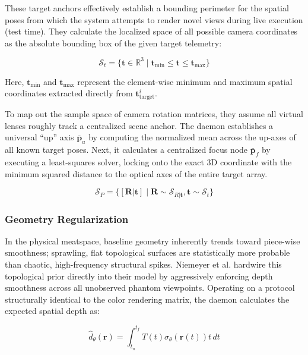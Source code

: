 These target anchors effectively establish a bounding perimeter for the spatial poses from which the system attempts to render novel views during live execution (test time). They calculate the localized space of all possible camera coordinates as the absolute bounding box of the given target telemetry:

\begin{equation}
\mathcal{S}_t = \{ \mathbf{t} \in \mathbb{R}^3 \mid \mathbf{t}_{\text{min}} \le \mathbf{t} \le \mathbf{t}_{\text{max}} \}
\end{equation}

Here, $\mathbf{t}_{\text{min}}$ and $\mathbf{t}_{\text{max}}$ represent the element-wise minimum and maximum spatial coordinates extracted directly from $\mathbf{t}_{\text{target}}^i$.

To map out the sample space of camera rotation matrices, they assume all virtual lenses roughly track a centralized scene anchor. The daemon establishes a universal ``up'' axis $\bar{\mathbf{p}}_u$ by computing the normalized mean across the up-axes of all known target poses. Next, it calculates a centralized focus node $\bar{\mathbf{p}}_f$ by executing a least-squares solver, locking onto the exact 3D coordinate with the minimum squared distance to the optical axes of the entire target array. 

\begin{equation}
\mathcal{S}_P = \{[\mathbf{R}|\mathbf{t}] \mid \mathbf{R} \sim \mathcal{S}_{R|\mathbf{t}}, \mathbf{t} \sim \mathcal{S}_t\}
\end{equation}

\subsubsection{Geometry Regularization}
In the physical meatspace, baseline geometry inherently trends toward piece-wise smoothness; sprawling, flat topological surfaces are statistically more probable than chaotic, high-frequency structural spikes. Niemeyer et al. hardwire this topological prior directly into their model by aggressively enforcing depth smoothness across all unobserved phantom viewpoints. Operating on a protocol structurally identical to the color rendering matrix, the daemon calculates the expected spatial depth as:

\begin{equation}
\hat{d}_\theta(\mathbf{r}) = \int_{t_n}^{t_f} T(t)\sigma_\theta(\mathbf{r}(t))t \, dt
\end{equation}


